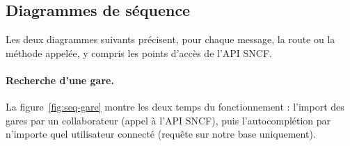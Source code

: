 \documentclass[11pt,a4paper]{article}
\begin{document}
\subsection{Diagrammes de séquence}

Les deux diagrammes suivants précisent, pour chaque message, la route ou la méthode appelée, y
compris les points d'accès de l'API SNCF.

\paragraph{Recherche d'une gare.}
La figure~\ref{fig:seq-gare} montre les deux temps du fonctionnement : l'import des gares par un
collaborateur (appel à l'API SNCF), puis l'autocomplétion par n'importe quel utilisateur connecté
(requête sur notre base uniquement).
\end{document}
